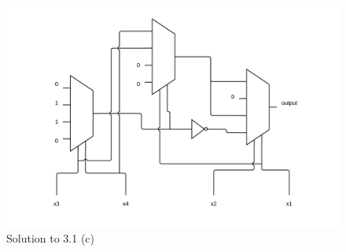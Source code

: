 \documentclass[10pt,a4paper]{scrartcl}
\begin{document}
\vspace{1em}
\begin{figure}[h]
  \centering\includegraphics[width=\linewidth]{images/exercise_3_1_c.png}
  \caption{Solution to 3.1 (c)}
\end{figure}
\vspace{1em}

\FloatBarrier
\end{document}
